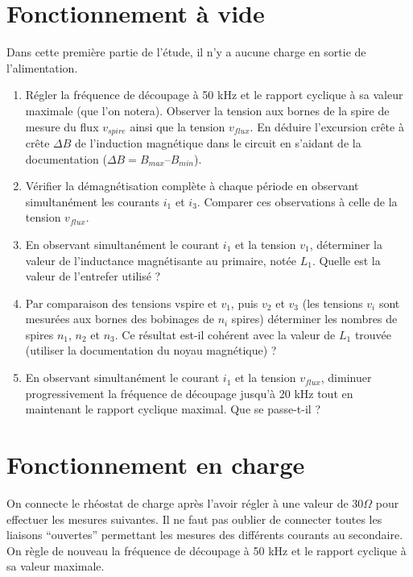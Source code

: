 \section{Fonctionnement à vide}

Dans cette première partie de l’étude, il n’y a aucune charge en sortie de l’alimentation.

\begin{enumerate}
\item Régler la fréquence de découpage à 50 kHz et le rapport cyclique à sa valeur maximale (que l’on notera). Observer la tension aux bornes de la spire de mesure du flux $v_{spire}$ ainsi que la tension $v_{flux}$. En déduire l’excursion crête à crête $\Delta B$ de l'induction magnétique dans le circuit en s’aidant de la documentation ($\Delta B = B_{max} – B_{min}$).

\item Vérifier la démagnétisation complète à chaque période en observant simultanément les courants $i_1$ et $i_3$. Comparer ces observations à celle de la tension $v_{flux}$.

\item En observant simultanément le courant $i_1$ et la tension $v_1$, déterminer la valeur de l’inductance magnétisante au primaire, notée $L_1$. Quelle est la valeur de l’entrefer utilisé ?

\item Par comparaison des tensions vspire et $v_1$, puis $v_2$ et $v_3$ (les tensions $v_i$ sont mesurées aux bornes des bobinages de $n_i$ spires) déterminer les nombres de spires $n_1$, $n_2$ et $n_3$. Ce résultat est-il cohérent avec la valeur de $L_1$ trouvée (utiliser la documentation du noyau magnétique) ?

\item En observant simultanément le courant $i_1$ et la tension $v_{flux}$, diminuer progressivement la fréquence de découpage jusqu’à 20 kHz tout en maintenant le rapport cyclique maximal. Que se passe-t-il ?
\end{enumerate}

\newpage
\section{Fonctionnement en charge}

On connecte le rhéostat de charge après l’avoir régler à une valeur de $30\Omega$  pour effectuer les mesures suivantes. Il ne faut pas oublier de connecter toutes les liaisons ``ouvertes'' permettant les mesures des différents courants au secondaire. On règle de nouveau la fréquence de découpage à 50 kHz et le rapport cyclique à sa valeur maximale.


